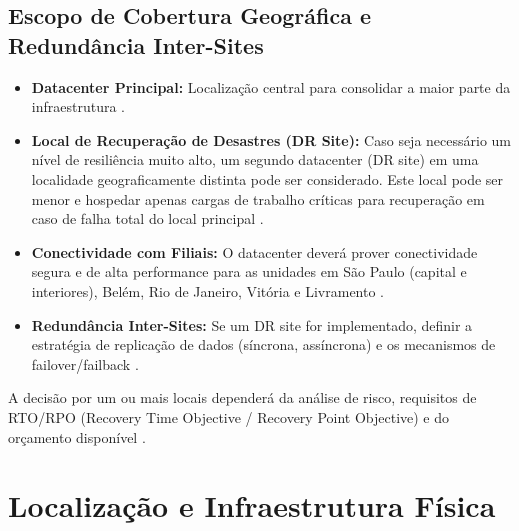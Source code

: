\documentclass[
	12pt,				%
	oneside,			%
	a4paper,			%
	english,			%
	brazil				%
	]{abntex2unama}
\begin{document}
\section{Escopo de Cobertura Geográfica e Redundância Inter-Sites}
\begin{itemize}
	\item \textbf{Datacenter Principal:} Localização central para consolidar a maior parte da infraestrutura \cite{design_principles}.
	\item \textbf{Local de Recuperação de Desastres (DR Site):} Caso seja necessário um nível de resiliência muito alto, um segundo datacenter (DR site) em uma localidade geograficamente distinta pode ser considerado. Este local pode ser menor e hospedar apenas cargas de trabalho críticas para recuperação em caso de falha total do local principal \cite{disaster_recovery}.
	\item \textbf{Conectividade com Filiais:} O datacenter deverá prover conectividade segura e de alta performance para as unidades em São Paulo (capital e interiores), Belém, Rio de Janeiro, Vitória e Livramento \cite{edge_computing}.
	\item \textbf{Redundância Inter-Sites:} Se um DR site for implementado, definir a estratégia de replicação de dados (síncrona, assíncrona) e os mecanismos de failover/failback \cite{datacenter_security}.
\end{itemize}
A decisão por um ou mais locais dependerá da análise de risco, requisitos de RTO/RPO (Recovery Time Objective / Recovery Point Objective) e do orçamento disponível \cite{modular_datacenters}.

\chapter{Localização e Infraestrutura Física}
\end{document}

